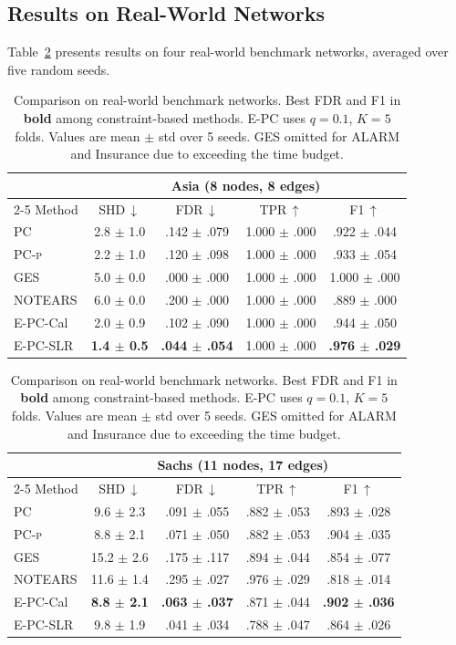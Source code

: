 \documentclass[11pt]{article}
\newcommand{\epc}{\textsc{E-PC}}
\newcommand{\pcp}{\textsc{PC-p}}
\begin{document}
\subsection{Results on Real-World Networks}

Table~\ref{tab:real} presents results on four real-world benchmark networks, averaged over five random seeds.

\begin{table}[t]
\caption{Comparison on real-world benchmark networks. Best FDR and F1 in \textbf{bold} among constraint-based methods. \epc{} uses $q = 0.1$, $K = 5$ folds. Values are mean $\pm$ std over 5 seeds. GES omitted for ALARM and Insurance due to exceeding the time budget.}
\label{tab:real}
\centering
\small
\begin{tabular}{l cccc}
\toprule
 & \multicolumn{4}{c}{Asia (8 nodes, 8 edges)} \\
\cmidrule(lr){2-5}
Method & SHD\,$\downarrow$ & FDR\,$\downarrow$ & TPR\,$\uparrow$ & F1\,$\uparrow$ \\
\midrule
PC & 2.8 $\pm$ 1.0 & .142 $\pm$ .079 & 1.000 $\pm$ .000 & .922 $\pm$ .044 \\
\pcp{} & 2.2 $\pm$ 1.0 & .120 $\pm$ .098 & 1.000 $\pm$ .000 & .933 $\pm$ .054 \\
GES & 5.0 $\pm$ 0.0 & .000 $\pm$ .000 & 1.000 $\pm$ .000 & 1.000 $\pm$ .000 \\
NOTEARS & 6.0 $\pm$ 0.0 & .200 $\pm$ .000 & 1.000 $\pm$ .000 & .889 $\pm$ .000 \\
\epc{}-Cal & 2.0 $\pm$ 0.9 & .102 $\pm$ .090 & 1.000 $\pm$ .000 & .944 $\pm$ .050 \\
\epc{}-SLR & \textbf{1.4 $\pm$ 0.5} & \textbf{.044 $\pm$ .054} & 1.000 $\pm$ .000 & \textbf{.976 $\pm$ .029} \\
\bottomrule
\end{tabular}

\vspace{0.5em}

\begin{tabular}{l cccc}
\toprule
 & \multicolumn{4}{c}{Sachs (11 nodes, 17 edges)} \\
\cmidrule(lr){2-5}
Method & SHD\,$\downarrow$ & FDR\,$\downarrow$ & TPR\,$\uparrow$ & F1\,$\uparrow$ \\
\midrule
PC & 9.6 $\pm$ 2.3 & .091 $\pm$ .055 & .882 $\pm$ .053 & .893 $\pm$ .028 \\
\pcp{} & 8.8 $\pm$ 2.1 & .071 $\pm$ .050 & .882 $\pm$ .053 & .904 $\pm$ .035 \\
GES & 15.2 $\pm$ 2.6 & .175 $\pm$ .117 & .894 $\pm$ .044 & .854 $\pm$ .077 \\
NOTEARS & 11.6 $\pm$ 1.4 & .295 $\pm$ .027 & .976 $\pm$ .029 & .818 $\pm$ .014 \\
\epc{}-Cal & \textbf{8.8 $\pm$ 2.1} & \textbf{.063 $\pm$ .037} & .871 $\pm$ .044 & \textbf{.902 $\pm$ .036} \\
\epc{}-SLR & 9.8 $\pm$ 1.9 & .041 $\pm$ .034 & .788 $\pm$ .047 & .864 $\pm$ .026 \\
\bottomrule
\end{tabular}


\end{table}
\end{document}
